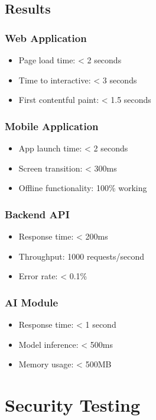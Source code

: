 \subsection{Results}

\subsubsection{Web Application}
\begin{itemize}
    \item Page load time: < 2 seconds
    \item Time to interactive: < 3 seconds
    \item First contentful paint: < 1.5 seconds
\end{itemize}

\subsubsection{Mobile Application}
\begin{itemize}
    \item App launch time: < 2 seconds
    \item Screen transition: < 300ms
    \item Offline functionality: 100\% working
\end{itemize}

\subsubsection{Backend API}
\begin{itemize}
    \item Response time: < 200ms
    \item Throughput: 1000 requests/second
    \item Error rate: < 0.1\%
\end{itemize}

\subsubsection{AI Module}
\begin{itemize}
    \item Response time: < 1 second
    \item Model inference: < 500ms
    \item Memory usage: < 500MB
\end{itemize}

\section{Security Testing}

